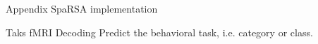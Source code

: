 \documentclass[11pt]{beamer}
\begin{document}
\appendix
\begin{frame}{Appendix}
    SpaRSA implementation
\end{frame}
\begin{frame}{Taks fMRI Decoding}
    Predict the behavioral task, i.e. category or class.
\end{frame}
\end{document}
